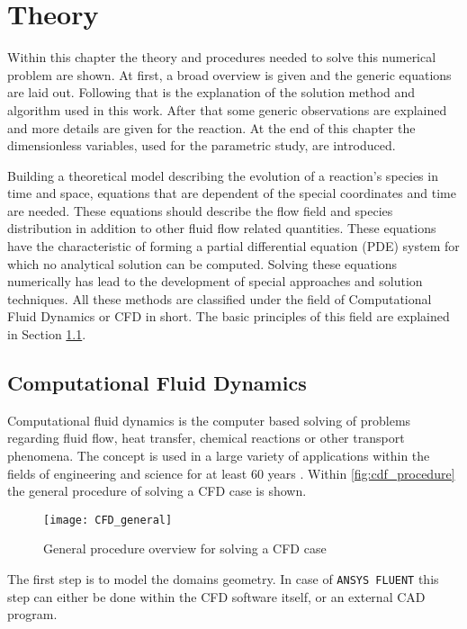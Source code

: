 \documentclass[../thesis.tex]{subfiles}
\begin{document}
\chapter{Theory}
\label{chp:theory}

Within this chapter the theory and procedures needed to solve this numerical problem are shown. At first, a broad overview is given and the generic equations are laid out. Following that is the explanation of the solution method and algorithm used in this work. After that some generic observations are explained and more details are given for the reaction. At the end of this chapter the dimensionless variables, used for the parametric study, are introduced.

Building a theoretical model describing the evolution of a reaction's species in time and space, equations that are dependent of the special coordinates and time are needed. These equations should describe the flow field and species distribution in addition to other fluid flow related quantities. These equations have the characteristic of forming a partial differential equation (PDE) system for which no analytical solution can be computed. Solving these equations numerically has lead to the development of special approaches and solution techniques. All these methods are classified under the field of Computational Fluid Dynamics or CFD in short. The basic principles of this field are explained in Section \ref{sec: CFD}. 
 
\section{Computational Fluid Dynamics}
\label{sec: CFD}

Computational fluid dynamics is the computer based solving of problems regarding fluid flow, heat transfer, chemical reactions or other transport phenomena. The concept is used in a large variety of applications within the fields of engineering and science for at least 60 years \cite{versteeg2007introduction}. Within \autoref{fig:cdf_procedure} the general procedure of solving a CFD case is shown.
\begin{figure}[htbp]
	\centering
	\texttt{[image: CFD\_general]}
	\caption{General procedure overview for solving a CFD case}
	\label{fig:cdf_procedure}
\end{figure}

The first step is to model the domains geometry. In case of \texttt{ANSYS FLUENT} this step can either be done within the CFD software itself, or an external CAD program. 
\end{document}
